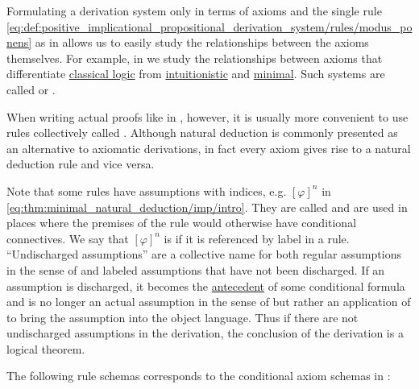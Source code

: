 \begin{proposition}\label{thm:minimal_natural_deduction}
  Formulating a derivation system only in terms of axioms and the single rule \eqref{eq:def:positive_implicational_propositional_derivation_system/rules/modus_ponens} as in  allows us to easily study the relationships between the axioms themselves. For example, in  we study the relationships between axioms that differentiate \hyperref[def:classical_logic]{classical logic} from \hyperref[def:intuitionistic_logic]{intuitionistic} and \hyperref[def:minimal_logic]{minimal}. Such systems are called  or .

  When writing actual proofs like in , however, it is usually more convenient to use rules collectively called . Although natural deduction is commonly presented as an alternative to axiomatic derivations, in fact every axiom gives rise to a natural deduction rule and vice versa.

  Note that some rules have assumptions with indices, e.g. \( [\varphi]^n \) in \eqref{eq:thm:minimal_natural_deduction/imp/intro}. They are called  and are used in places where the premises of the rule would otherwise have conditional connectives. We say that \( [\varphi]^n \) is  if it is referenced by label in a rule. \enquote{Undischarged assumptions} are a collective name for both regular assumptions in the sense of  and labeled assumptions that have not been discharged. If an assumption is discharged, it becomes the \hyperref[def:material_implication/antecedent]{antecedent} of some conditional formula and is no longer an actual assumption in the sense of  but rather an application of  to bring the assumption into the object language. Thus if there are not undischarged assumptions in the derivation, the conclusion of the derivation is a logical theorem.

  \begin{thmenum}
     The following rule schemas corresponds to the conditional axiom schemas in :


\end{thmenum}
\end{proposition}
